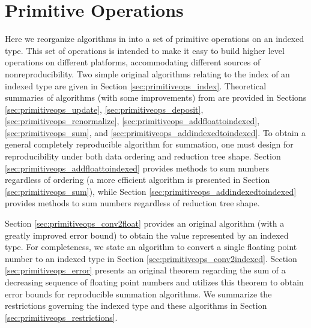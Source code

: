 \section{Primitive Operations}
    \label{sec:primitiveops}
    Here we reorganize algorithms in \cite{repsum} into a set of
    primitive operations on an indexed type. This set of operations is 
    intended to make it easy to build higher level operations on different
    platforms, accommodating different sources of nonreproducibility. Two simple original algorithms
    relating to the index of an indexed type are given in Section
    \ref{sec:primitiveops_index}. Theoretical summaries of algorithms (with
    some improvements) from \cite{repsum} are provided in Sections
    \ref{sec:primitiveops_update}, \ref{sec:primitiveops_deposit},
    \ref{sec:primitiveops_renormalize},
    \ref{sec:primitiveops_addfloattoindexed}, \ref{sec:primitiveops_sum},
    and \ref{sec:primitiveops_addindexedtoindexed}. To obtain a general
    completely reproducible algorithm for summation, one must design for
    reproducibility under both data ordering and reduction tree shape.
    Section \ref{sec:primitiveops_addfloattoindexed} provides methods to
    sum numbers regardless of ordering (a more efficient algorithm is presented in Section \ref{sec:primitiveops_sum}), while Section
    \ref{sec:primitiveops_addindexedtoindexed} provides methods to sum
    numbers regardless of reduction tree shape.

    Section \ref{sec:primitiveops_conv2float} provides an original algorithm (with a greatly
    improved error bound) to obtain the value represented by an indexed type.
    For completeness, we state an algorithm to convert a single floating point number to an indexed type in Section \ref{sec:primitiveops_conv2indexed}.
    Section \ref{sec:primitiveops_error} presents an original theorem regarding the sum of a decreasing sequence of floating point numbers and utilizes this theorem to obtain error bounds for reproducible summation algorithms. We summarize the restrictions governing the indexed type and these algorithms in Section \ref{sec:primitiveops_restrictions}.

    
    
    
    
    
    
    
    
    
    
    

